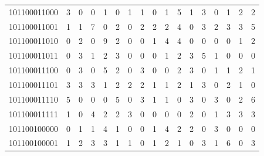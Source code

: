 \documentclass[10pt,a4paper]{article}
\begin{document}
\begin{longtable}{ |c|c|c|c|c|c|c|c|c|c|c|c|c|c|c|c|c| }
    101100011000              & 3                            & 0                                & 0                            & 1                              & 0   & 1   & 1   & 0   & 1   & 5   & 1   & 3   & 0   & 1   & 2   & 2   \\
    101100011001              & 1                            & 1                                & 7                            & 0                              & 2   & 0   & 2   & 2   & 2   & 4   & 0   & 3   & 2   & 3   & 3   & 5   \\
    101100011010              & 0                            & 2                                & 0                            & 9                              & 2   & 0   & 0   & 1   & 4   & 4   & 0   & 0   & 0   & 0   & 1   & 2   \\
    101100011011              & 0                            & 3                                & 1                            & 2                              & 3   & 0   & 0   & 0   & 1   & 2   & 3   & 5   & 1   & 0   & 0   & 0   \\
    101100011100              & 0                            & 3                                & 0                            & 5                              & 2   & 0   & 3   & 0   & 0   & 2   & 3   & 0   & 1   & 1   & 2   & 1   \\
    101100011101              & 3                            & 3                                & 3                            & 1                              & 2   & 2   & 2   & 1   & 1   & 2   & 1   & 3   & 0   & 2   & 1   & 0   \\
    101100011110              & 5                            & 0                                & 0                            & 0                              & 5   & 0   & 3   & 1   & 1   & 0   & 3   & 0   & 3   & 0   & 2   & 6   \\
    101100011111              & 1                            & 0                                & 4                            & 2                              & 2   & 3   & 0   & 0   & 0   & 0   & 2   & 0   & 1   & 3   & 3   & 3   \\
    101100100000              & 0                            & 1                                & 1                            & 4                              & 1   & 0   & 0   & 1   & 4   & 2   & 2   & 0   & 3   & 0   & 0   & 0   \\
    101100100001              & 1                            & 2                                & 3                            & 3                              & 1   & 1   & 0   & 1   & 2   & 1   & 0   & 3   & 1   & 6   & 0   & 3   \\

\end{longtable}
\end{document}
